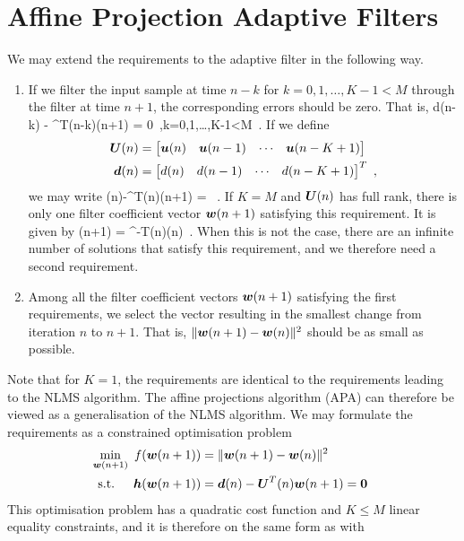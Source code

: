 \section{Affine Projection Adaptive Filters}
We may extend the requirements to the adaptive filter in the following way.
\begin{enumerate}
  \item If we filter the input sample at time $n-k$ for $k=0,1,\ldots,K-1<M$ through the filter at time $n+1$, the corresponding errors should be zero. That is,
  \bmath
    d(n-k) - ^T(n-k)(n+1) = 0\ ,\quad k=0,1,\ldots,K-1<M\ .
  \emath
  If we define
  \begin{align}
    \boldsymbol{U}(n) &= \begin{bmatrix}\boldsymbol{u}(n) & \boldsymbol{u}(n-1) & \cdots & \boldsymbol{u}(n-K+1)\end{bmatrix}\\
    \boldsymbol{d}(n) &= \begin{bmatrix} d(n) & d(n-1) & \cdots & d(n-K+1)\end{bmatrix}^T\ ,
  \end{align}
  we may write
  \bmath
    (n)-^T(n)(n+1) = \ .
  \emath
  If $K=M$ and $\boldsymbol{U}(n)$ has full rank, there is only one filter coefficient vector $\boldsymbol{w}(n+1)$ satisfying this requirement. It is given by
  \bmath
    (n+1) = ^{-T}(n)(n)\ .
  \emath
  When this is not the case, there are an infinite number of solutions that satisfy this requirement, and we therefore need a second requirement.
  \item Among all the filter coefficient vectors $\boldsymbol{w}(n+1)$ satisfying the first requirements, we select the vector resulting in the smallest change from iteration $n$ to $n+1$. That is, $\|\boldsymbol{w}(n+1)-\boldsymbol{w}(n)\|^2$ should be as small as possible.
\end{enumerate}
Note that for $K=1$, the requirements are identical to the requirements leading to the NLMS algorithm. The affine projections algorithm (APA) can therefore be viewed as a generalisation of the NLMS algorithm. We may formulate the requirements as a constrained optimisation problem
\begin{gather}
  \begin{alignedat}{2}
      &\min_{\mathclap{\vect{w}(n+1)}} &\quad f(\vect{w}(n+1)) &=\|\vect{w}(n+1)-\vect{w}(n)\|^2\\
      &\text{s.t.}&\quad \vect{h}(\vect{w}(n+1)) &=  \vect{d}(n)-\vect{U}^T(n)\vect{w}(n+1) = \vect{0}
  \end{alignedat}
  \label{eq:apa_opt}
\end{gather}
This optimisation problem has a quadratic cost function and $K\leq M$ linear equality constraints, and it is therefore on the same form as  with
